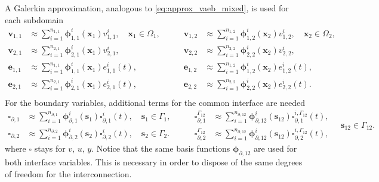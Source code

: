 A Galerkin approximation, analogous to \eqref{eq:approx_vaeb_mixed}, is used for each subdomain
\begin{equation}
\begin{aligned}
\bm{v}_{1, 1} &\approx \sum_{i=1}^{n_{1, 1}} \bm{\phi}_{1, 1}^i(\bm{x}_1) v_{1, 1}^i, \quad \bm{x}_1 \in \Omega_1, \\
\bm{v}_{2, 1} &\approx \sum_{i=1}^{n_{2, 1}} \bm{\phi}_{2, 1}^i(\bm{x}_1) v_{2, 1}^i, \\
\bm{e}_{1, 1} &\approx \sum_{i=1}^{n_{1, 1}} \bm{\phi}_{1, 1}^i(\bm{x}_1) e_{1, 1}^i(t), \\
\bm{e}_{2, 1} &\approx \sum_{i=1}^{n_{2, 1}} \bm{\phi}_{2, 1}^i(\bm{x}_1) e_{2, 1}^i(t),  \\
\end{aligned}  \qquad 
\begin{aligned}
\bm{v}_{1, 2} &\approx \sum_{i=1}^{n_{1, 2}} \bm{\phi}_{1, 2}^i(\bm{x}_2) v_{1, 2}^i, \quad \bm{x}_2 \in \Omega_2, \\
\bm{v}_{2, 2} &\approx \sum_{i=1}^{n_{2, 2}} \bm{\phi}_{2, 2}^i(\bm{x}_2) v_{2, 2}^i, \\
\bm{e}_{1, 2} &\approx \sum_{i=1}^{n_{1, 2}} \bm{\phi}_{1, 2}^i(\bm{x}_2) e_{1, 2}^i(t), \\
\bm{e}_{2, 2} &\approx \sum_{i=1}^{n_{2, 2}} \bm{\phi}_{2, 2}^i(\bm{x}_2) e_{2, 2}^i(t).  \\
\end{aligned} 
\end{equation}
For the boundary variables, additional terms for the common interface are needed 
\begin{equation}\label{eq:approx_vuy_int}
\begin{aligned}
\bm{\square}_{\partial, 1} &\approx \sum_{i=1}^{n_{\partial, 1}} \bm{\phi}_{\partial, 1}^i(\bm{s}_1) \square_{\partial, 1}^i(t), \quad \bm{s}_1 \in \Gamma_1, \\
\bm{\square}_{\partial, 2} &\approx \sum_{i=1}^{n_{\partial, 2}} \bm{\phi}_{\partial, 2}^i(\bm{s}_2) \square_{\partial, 2}^i(t), \quad \bm{s}_2 \in \Gamma_2.
\end{aligned} \qquad
\begin{aligned}
\bm{\square}_{\partial, 1}^{\Gamma_{12}} &\approx \sum_{i=1}^{n_{\partial, 12}} \bm{\phi}_{\partial, 12}^i(\bm{s}_{12}) \square_{\partial, 1}^{i, \Gamma_{12}}(t), \\
\bm{\square}_{\partial, 2}^{\Gamma_{12}}  &\approx \sum_{i=1}^{n_{\partial, 12}} \bm{\phi}_{\partial, 12}^i(\bm{s}_{12}) \square_{\partial, 2}^{i, \Gamma_{12}}(t), 
\end{aligned} \quad \bm{s}_{12} \in \Gamma_{12}.
\end{equation}
where $\square$ stays for $v,\, u,\, y$. Notice that the same basis functions $\bm{\phi}_{\partial, 12}$ are used for both interface variables. This is necessary in order to dispose of the same degrees of freedom for the interconnection.



